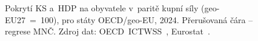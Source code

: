 \def\strEuPokrytiPrijemTitle{Korelace: pokrytí \aclins{KS} a~\acs{HDP} na obyvatele}%
\def\strEuPokrytiPrijemXlabel{pokrytí \acs{KS} [\%]}%
\def\strEuPokrytiPrijemYlabel{\acs{HDP} na obyvatele [\acs{PPS}, \acs{geo-EU27} = 100]}%
\def\strEuPokrytiPrijemCaption{Pokrytí \acs{KS} a~\acs{HDP} na obyvatele v~paritě kupní síly (\acs{geo-EU27} = 100), pro státy OECD/\acs{geo-EU}, 2024. Přerušovaná čára -- regrese \acs{MNČ}. Zdroj dat: \acs{OECD}~\acs{ICTWSS}~\cite{oecd_aias_ictwss_CBC_ERB_pct}, Eurostat~\cite{eurostat_nama_10_pc_PPS_EU27eq100}.}%
%
\begin{figure}[htbp]
  \centering
  \resizebox{\linewidth}{!}{}
  \caption{\strEuPokrytiPrijemCaption}
  \label{fig:eu_pokryti_prijem}
\end{figure}
